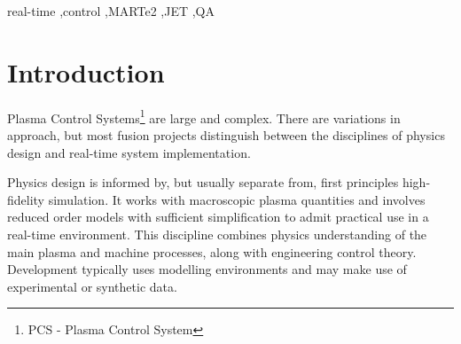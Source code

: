 \documentclass[preprint]{elsarticle}
\begin{document}
\begin{frontmatter}

\begin{keyword}
real-time \sep control \sep MARTe2 \sep JET \sep QA



\end{keyword}

\end{frontmatter}



\section{Introduction}
\label{sec:intro}


Plasma Control Systems\footnote{PCS - Plasma Control System} are large and complex.
There are variations in approach, but most fusion projects distinguish between
the disciplines of physics design and real-time system implementation.

Physics design is informed by, but usually separate from, first principles 
high-fidelity simulation. It works with macroscopic plasma quantities
and involves reduced order models with sufficient simplification to admit
practical use in a real-time environment.  This discipline combines
physics understanding of the main plasma and machine processes, along
with engineering control theory. Development typically uses modelling 
environments and may make use of experimental or synthetic data.
\end{document}
